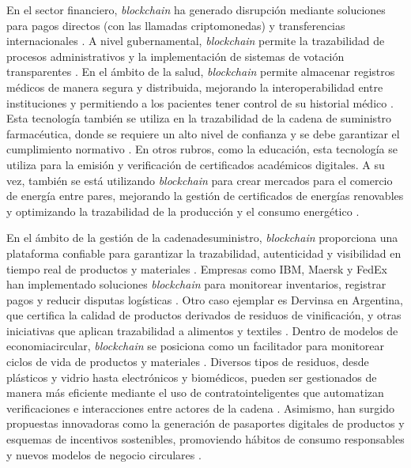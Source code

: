 En el sector financiero, \textit{blockchain} ha generado disrupción mediante soluciones para pagos directos (con las llamadas \glspl{criptomoneda}) y transferencias internacionales \cite{bartolomeo2020introduccion}. A nivel gubernamental, \textit{blockchain} permite la \gls{trazabilidad} de procesos administrativos y la implementación de sistemas de votación transparentes \cite{vaigandla2023review}. En el ámbito de la salud, \textit{blockchain} permite almacenar registros médicos de manera segura y distribuida, mejorando la interoperabilidad entre instituciones y permitiendo a los pacientes tener control de su historial médico \cite{sunny2022systematic}. Esta tecnología también se utiliza en la trazabilidad de la cadena de suministro farmacéutica, donde se requiere un alto nivel de confianza y se debe garantizar el cumplimiento normativo \cite{vaigandla2023review}. En otros rubros, como la educación, esta tecnología se utiliza para la emisión y verificación de certificados académicos digitales. A su vez, también se está utilizando \textit{blockchain} para crear mercados para el comercio de energía entre pares, mejorando la gestión de certificados de energías renovables y optimizando la trazabilidad de la producción y el consumo energético \cite{sunny2022systematic, vaigandla2023review}.

En el ámbito de la gestión de la \gls{cadenadesuministro}, \textit{blockchain} proporciona una plataforma confiable para garantizar la trazabilidad, autenticidad y visibilidad en tiempo real de productos y materiales \cite{torres2022tendencias, sharabati2024blockchain}. Empresas como IBM, Maersk y FedEx han implementado soluciones \textit{blockchain} para monitorear inventarios, registrar pagos y reducir disputas logísticas \cite{tripathi2023comprehensive}. Otro caso ejemplar es Dervinsa en Argentina, que certifica la calidad de productos derivados de residuos de vinificación, y otras iniciativas que aplican trazabilidad a alimentos y textiles \cite{bartolomeo2020introduccion}. Dentro de modelos de \gls{economiacircular}, \textit{blockchain} se posiciona como un facilitador para monitorear ciclos de vida de productos y materiales \cite{bulkowska2023implementation, baralla2023waste}. Diversos tipos de residuos, desde plásticos y vidrio hasta electrónicos y biomédicos, pueden ser gestionados de manera más eficiente mediante el uso de \glspl{contratointeligente} que automatizan verificaciones e interacciones entre actores de la cadena \cite{baralla2023waste}. Asimismo, han surgido propuestas innovadoras como la generación de pasaportes digitales de productos y esquemas de incentivos sostenibles, promoviendo hábitos de consumo responsables y nuevos modelos de negocio circulares \cite{baralla2023waste}.

